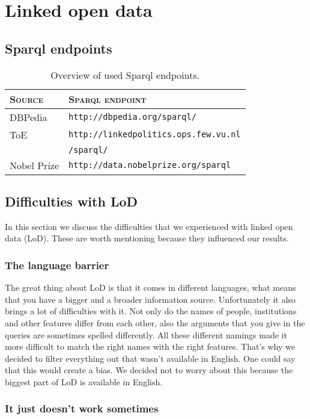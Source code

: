 \pagebreak
\section{Linked open data}
\label{sec:lod}
\subsection{Sparql endpoints}
\begin{table}[H]
\centering
\begin{tabular}{l|l}
	\textbf{\textsc{Source}} & \textbf{\textsc{Sparql endpoint}} \\ \hline
	\rule{0pt}{4mm}DBPedia & \texttt{http://dbpedia.org/sparql/} \\
	ToE &  \texttt{http://linkedpolitics.ops.few.vu.nl} \\
	& \texttt{/sparql/} \\
	Nobel Prize & \texttt{http://data.nobelprize.org/sparql}
\end{tabular}
\caption{Overview of used Sparql endpoints.}
\end{table}
\subsection{Difficulties with LoD}
In this section we discuss the difficulties that we experienced with linked open data (LoD). These are worth mentioning because they influenced our results.

\subsubsection{The language barrier}
The great thing about LoD is that it comes in different languages, what means that you have a bigger and a broader information source.
Unfortunately it also brings a lot of difficulties with it.
Not only do the names of people, institutions and other features differ from each other, also the arguments that you give in the queries are sometimes spelled differently.
All these different namings made it more difficult to match the right names with the right features.
That's why we decided to filter everything out that wasn't available in English. One could say that this would create a bias. We decided not to worry about this because the biggest part of LoD is available in English.

\subsubsection{It just doesn't work sometimes}

